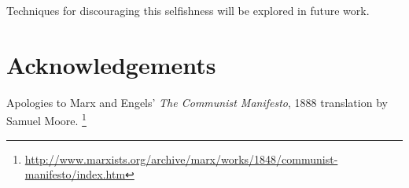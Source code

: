 \documentclass[10pt]{article}
\begin{document}
Techniques for discouraging this selfishness will be explored in future work.

\pagebreak
\section*{Acknowledgements}
Apologies to Marx and Engels' \textit{The Communist Manifesto}, 1888 translation
by Samuel Moore.%
\footnote{\url{http://www.marxists.org/archive/marx/works/1848/communist-manifesto/index.htm}}

\vspace{2em}
\end{document}
